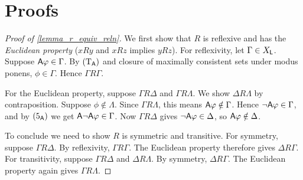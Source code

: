 \section{Proofs}
\label{app_proofs}

\begin{proof}[Proof of \cref{lemma_r_equiv_reln}]

    We first show that $R$ is reflexive and has the \emph{Euclidean property}
    ($xRy$ and $xRz$ implies $yRz$). For reflexivity, let $\Gamma \in X_{\mathsf{L}}$.
    Suppose $\mathsf{A}\varphi \in \Gamma$. By $(\text{T}_{\mathsf{A}})$ and closure of maximally
    consistent sets under modus ponens, $\phi \in \Gamma$. Hence $\Gamma R
    \Gamma$.

    For the Euclidean property, suppose $\Gamma R \Delta$ and $\Gamma R
    \Lambda$. We show $\Delta R \Lambda$ by contraposition. Suppose $\phi
    \notin \Lambda$.  Since $\Gamma R \Lambda$, this means $\mathsf{A}\varphi \notin
    \Gamma$. Hence $\neg\mathsf{A}\varphi \in \Gamma$, and by $(\text{5}_{\mathsf{A}})$ we get
    $\mathsf{A}\neg\mathsf{A}\varphi \in \Gamma$. Now $\Gamma R \Delta$ gives $\neg\mathsf{A}\varphi \in
    \Delta$, so $\mathsf{A}\varphi \notin \Delta$.

    To conclude we need to show $R$ is symmetric and transitive.  For symmetry,
    suppose $\Gamma R \Delta$. By reflexivity, $\Gamma R \Gamma$. The Euclidean
    property therefore gives $\Delta R \Gamma$. For transitivity, suppose
    $\Gamma R \Delta$ and $\Delta R \Lambda$. By symmetry, $\Delta R \Gamma$.
    The Euclidean property again gives $\Gamma R \Lambda$.
\end{proof}

